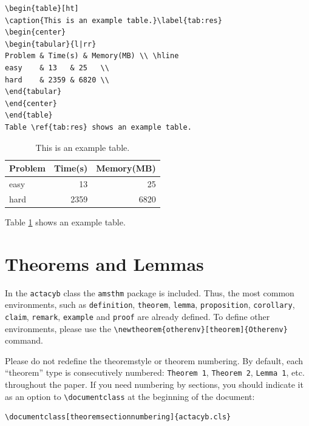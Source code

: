 \documentclass[notnumberedtheorems,withtitlethanks]{actacyb}
\begin{document}
\begin{verbatim}
\begin{table}[ht]
\caption{This is an example table.}\label{tab:res}
\begin{center}
\begin{tabular}{l|rr}
Problem & Time(s) & Memory(MB) \\ \hline
easy    & 13   & 25   \\
hard    & 2359 & 6820 \\
\end{tabular}
\end{center}
\end{table}
Table \ref{tab:res} shows an example table.
\end{verbatim}

\begin{table}[ht]
\caption{This is an example table.}\label{tab:res}
\begin{center}
\begin{tabular}{l|rr}
Problem & Time(s) & Memory(MB) \\ \hline
easy    & 13   & 25   \\
hard    & 2359 & 6820 \\
\end{tabular}
\end{center}
\end{table}
Table \ref{tab:res} shows an example table.


\section{Theorems and Lemmas}

In the \verb|actacyb| class the \verb|amsthm| package is included.
Thus, the most common environments, such as \verb|definition|, \verb|theorem|, \verb|lemma|,
\verb|proposition|, \verb|corollary|, \verb|claim|, \verb|remark|, \verb|example| and \verb|proof| are already defined.
To define other environments, please use the \verb|\newtheorem{otherenv}[theorem]{Otherenv}|  
command.

Please do not redefine the theoremstyle or theorem numbering. 
By default, each ``theorem'' type is consecutively numbered:
\texttt{Theorem 1}, \texttt{Theorem 2}, \texttt{Lemma 1}, etc.
throughout the paper.
If you need numbering by sections, you should indicate it as an option to
\verb|\documentclass| at the beginning of the document:

\begin{verbatim}
\documentclass[theoremsectionnumbering]{actacyb.cls}
\end{verbatim}
\end{document}
